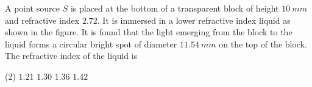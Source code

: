 
\item A point source $S$ is placed at the bottom of a transparent block of height $10\ mm$ and refractive index $2.72$. It is immersed in a lower refractive index liquid as shown in the figure. It is found that the light emerging from the block to the liquid forms a circular bright spot of diameter $11.54\ mm$ on the top of the block. The refractive index of the liquid is
    \begin{center}
    \end{center}
    \begin{tasks}(2)
        \task \(1.21\)
        \task \(1.30\)
        \task \(1.36\)
        \task \(1.42\)
    \end{tasks}

